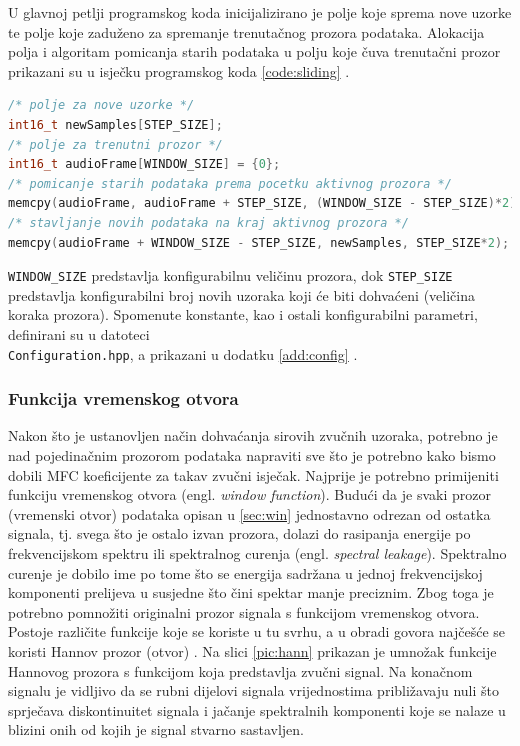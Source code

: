 U glavnoj petlji programskog koda inicijalizirano je polje koje sprema nove uzorke te 
polje koje zaduženo za spremanje trenutačnog prozora podataka. Alokacija polja i algoritam
pomicanja starih podataka u polju koje čuva trenutačni prozor prikazani su u isječku programskog
koda \ref{code:sliding} .

\begin{lstlisting}[language=C++, caption=Algoritam za korištenje novodohvaćenih podataka, label=code:sliding]
/* polje za nove uzorke */
int16_t newSamples[STEP_SIZE];
/* polje za trenutni prozor */
int16_t audioFrame[WINDOW_SIZE] = {0};
/* pomicanje starih podataka prema pocetku aktivnog prozora */
memcpy(audioFrame, audioFrame + STEP_SIZE, (WINDOW_SIZE - STEP_SIZE)*2);
/* stavljanje novih podataka na kraj aktivnog prozora */
memcpy(audioFrame + WINDOW_SIZE - STEP_SIZE, newSamples, STEP_SIZE*2);
\end{lstlisting}

\texttt{WINDOW\_SIZE} predstavlja konfigurabilnu veličinu prozora, dok \texttt{STEP\_SIZE} predstavlja 
konfigurabilni broj novih uzoraka koji će biti dohvaćeni (veličina koraka prozora).
Spomenute konstante, kao i ostali konfigurabilni parametri, definirani su u 
datoteci \\ \texttt{Configuration.hpp}, a prikazani u dodatku \ref{add:config} .

\subsubsection{Funkcija vremenskog otvora}
Nakon što je ustanovljen način dohvaćanja sirovih zvučnih uzoraka, potrebno je
nad pojedinačnim prozorom podataka napraviti sve što je potrebno kako bismo
dobili MFC koeficijente za takav zvučni isječak. Najprije je potrebno primijeniti funkciju vremenskog otvora
(engl. \textit{window function}). Budući da je svaki
prozor (vremenski otvor) podataka opisan u \ref{sec:win} jednostavno odrezan od ostatka
signala, tj. svega što je ostalo izvan prozora, dolazi do rasipanja energije po
frekvencijskom spektru ili spektralnog curenja (engl. \textit{spectral leakage}). Spektralno curenje
je dobilo ime po tome što se energija sadržana u jednoj frekvencijskoj komponenti prelijeva
u susjedne što čini spektar manje preciznim.
Zbog toga je potrebno pomnožiti originalni prozor signala s funkcijom vremenskog otvora. Postoje
različite funkcije koje se koriste u tu svrhu, a u obradi govora najčešće se koristi
Hannov prozor (otvor) \cite{windowing}.
Na slici \ref{pic:hann} prikazan je umnožak funkcije Hannovog prozora s funkcijom
koja predstavlja zvučni signal. Na konačnom signalu je vidljivo da se rubni dijelovi
signala vrijednostima približavaju nuli što sprječava diskontinuitet signala i jačanje
spektralnih komponenti koje se nalaze u blizini onih od kojih je signal stvarno sastavljen.

